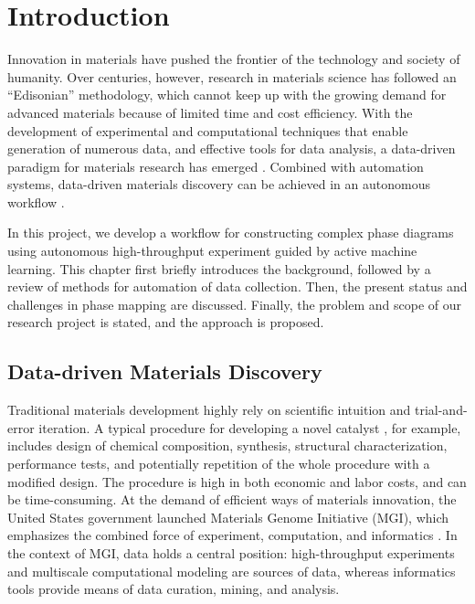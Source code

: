 
\chapter{Introduction}

Innovation in materials have pushed the frontier of the technology and society of humanity. Over centuries, however, research in materials science has followed an ``Edisonian'' methodology, which cannot keep up with the growing demand for advanced materials because of limited time and cost efficiency. With the development of experimental and computational techniques that enable generation of numerous data, and effective tools for data analysis, a data-driven paradigm  for materials research has emerged \parencite{MatDataSci}. Combined with automation systems, data-driven materials discovery can be achieved in an autonomous workflow \parencite{TBJoule}.

In this project, we develop a workflow for constructing complex phase diagrams using autonomous high-throughput experiment guided by active machine learning. This chapter first briefly introduces the background, followed by a review of methods for automation of data collection. Then, the present status and challenges in phase mapping are discussed. Finally, the problem and scope of our research project is stated, and the approach is proposed.

\section{Data-driven Materials Discovery}
Traditional materials development highly rely on scientific intuition and trial-and-error iteration. A typical procedure for developing a novel catalyst \parencite{Catalyst}, for example, includes design of chemical composition, synthesis, structural characterization, performance tests, and potentially repetition of the whole procedure with a modified design. The procedure is high in both economic and labor costs, and can be time-consuming. At the demand of efficient ways of materials innovation, the United States government launched Materials Genome Initiative (MGI), which emphasizes the combined force of experiment, computation, and informatics \parencite{FrontierMGI}. In the context of MGI, data holds a central position: high-throughput experiments and multiscale computational modeling are sources of data, whereas informatics tools provide means of data curation, mining, and analysis. 

